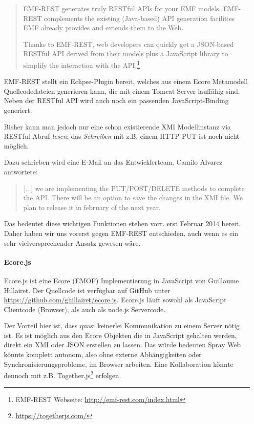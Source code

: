 \begin{quote}
EMF-REST generates truly RESTful APIs for your EMF models. EMF-REST complements the existing (Java-based) API generation facilities EMF already provides and extends them to the Web.

Thanks to EMF-REST, web developers can quickly get a JSON-based RESTful API derived from their models plus a JavaScript library to simplify the interaction with the API.\footnote{EMF-REST Webseite: \url{http://emf-rest.com/index.html}}
\end{quote}

\noindent EMF-REST stellt ein Eclipse-Plugin bereit, welches aus einem Ecore Metamodell
Quellcodedateien generieren kann, die mit einem Tomcat Server lauffähig sind.
Neben der RESTful API wird auch noch ein passenden JavaScript-Binding generiert.

Bisher kann man jedoch nur eine schon existierende XMI Modellinstanz via
RESTful Abruf \emph{lesen}; das \emph{Schreiben} mit z.B. einem HTTP-PUT
ist noch nicht möglich.

Dazu schrieben wird eine E-Mail an das Entwicklerteam, Camilo Alvarez antwortete:

\begin{quote}
[...] we are implementing the PUT/POST/DELETE methods to complete the API. There will be an option to save the changes in the XMI file.
We plan to release it in february of the next year.
\end{quote}

\noindent Das bedeutet diese wichtigen Funktionen stehen vorr. erst Februar 2014
bereit. Daher haben wir uns vorerst gegen EMF-REST entschieden, auch wenn es
ein sehr vielversprechender Ansatz gewesen wäre.

\paragraph{Ecore.js}

Ecore.js ist eine Ecore (EMOF) Implementierung in JavaScript von Guillaume Hillairet.
Der Quellcode ist verfügbar auf GitHub unter
\url{https://github.com/ghillairet/ecore.js}.
Ecore.js läuft sowohl als JavaScript Clientcode (Browser), als auch als
node.js Servercode.

Der Vorteil hier ist, dass quasi keinerlei Kommunikation zu einem Server nötig ist.
Es ist möglich aus den Ecore Objekten die in JavaScript gehalten werden,
direkt ein XMI oder JSON erstellen zu lassen.
Das würde bedeuten Spray Web könnte komplett autonom, also ohne externe
Abhängigkeiten oder Synchronisierungsprobleme, im Browser arbeiten.
Eine Kollaboration könnte dennoch mit z.B.
Together.js\footnote{\url{https://togetherjs.com/}} erfolgen.

